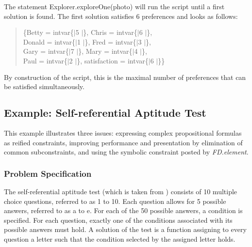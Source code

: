 \documentclass[a4paper,halfparskip]{scrartcl}
\begin{document}
The statement Explorer.exploreOne(photo) will run the script 
until a first solution is found. The first solution satisfies 
6 preferences and looks as follows:
\begin{quote}
\{Betty = intvar\{$|$5 $|$\}, 
 Chris = intvar\{$|$6 $|$\}, \\
 Donald = intvar\{$|$1 $|$\}, 
 Fred = intvar\{$|$3 $|$\}, \\
 Gary = intvar\{$|$7 $|$\}, 
 Mary = intvar\{$|$4 $|$\}, \\
 Paul = intvar\{$|$2 $|$\}, 
 satisfaction = intvar\{$|$6 $|$\}\}

\end{quote}
By construction of the script, this is the maximal number of 
preferences that can be satisfied simultaneously. 


\newpage
\subsection{Example: Self-referential Aptitude Test}
This example illustrates three issues: expressing complex 
propositional formulas as reified constraints, improving 
performance and presentation by elimination of common subconstraints, 
and using the symbolic constraint posted by \emph{FD.element}.

\subsubsection{Problem Specification}
The self-referential aptitude test (which is taken from \cite{10}) 
consists of 10 multiple choice questions, referred to as 1 to 10. 
Each question allows for 5 possible answers, referred to as a to e. 
For each of the 50 possible answers, a condition is specified. 
For each question, exactly one of the conditions associated with 
its possible answers must hold. A solution of the test is a function 
assigning to every question a letter such that the condition selected 
by the assigned letter holds.
\end{document}
